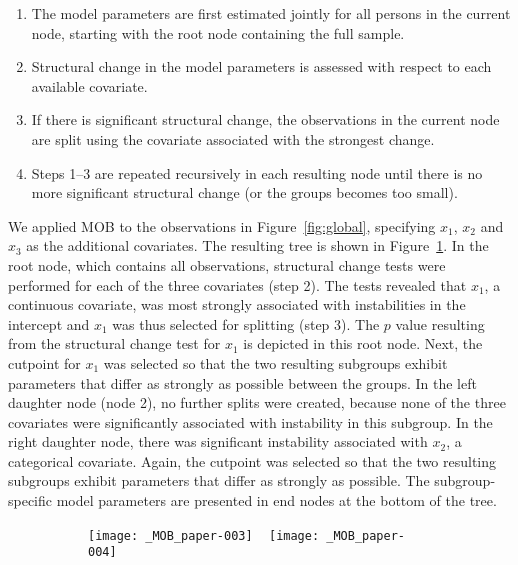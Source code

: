 \documentclass[doc,floatsintext,natbib]{apa7}
\begin{document}
\begin{enumerate}
\setlength\itemsep{0.25em}
\item The model parameters are first estimated jointly for all persons in the current node, starting with the root node containing the full sample.
\item Structural change in the model parameters is assessed with respect to each available covariate.
\item If there is significant structural change, the observations in the current node are split using the covariate associated with the strongest change.
\item Steps 1--3 are repeated recursively in each resulting node until there is no more significant structural change (or the groups becomes too small).
\end{enumerate}

We applied MOB to the observations in Figure~\ref{fig:global}, specifying $x_1$, $x_2$ and $x_3$ as the additional covariates. The resulting tree is shown in Figure~\ref{fig:tree}. In the root node, which contains all observations, structural change tests were performed for each of the three covariates (step 2). The tests revealed that $x_1$, a continuous covariate, was most strongly associated with instabilities in the intercept and $x_1$ was thus selected for splitting (step 3). The $p$ value resulting from the structural change test for $x_1$ is depicted in this root node. Next, the cutpoint for $x_1$ was selected so that the two resulting subgroups exhibit parameters that differ as strongly as possible between the groups. In the left daughter node (node 2), no further splits were created, because none of the three covariates were significantly associated with instability in this subgroup. In the right daughter node, there was significant instability associated with $x_2$, a categorical covariate. Again, the cutpoint was selected so that the two resulting subgroups exhibit parameters that differ as strongly as possible. The subgroup-specific model parameters are presented in end nodes at the bottom of the tree. 


\begin{figure}
\caption{Decision tree with group-specific parameters in the terminal nodes.}
\begin{subfigure}{.5\textwidth}
\texttt{[image: \_MOB\_paper-003]}
~
\texttt{[image: \_MOB\_paper-004]}
\end{subfigure}
\label{fig:tree}
\end{figure}
\end{document}
